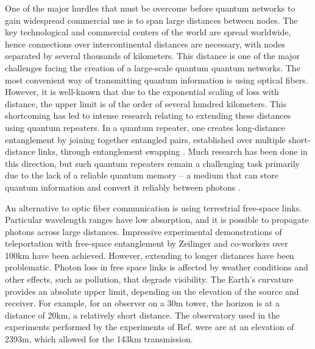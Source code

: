 \documentclass[aps,rmp,reprint,amsmath,amssymb,graphicx,longbibliography]{revtex4-1}
\begin{document}
One of the major hurdles that must be overcome before quantum networks to gain widespread commercial use is to span large distances between nodes.  The key technological and commercial centers of the world are spread worldwide, hence connections over intercontinental distances are necessary, with nodes separated by several thousands of kilometers. This distance is one of the major challenges facing the creation of a large-scale quantum quantum networks. The most convenient way of transmitting quantum information is using optical fibers. However, it is well-known that due to the exponential scaling of loss with distance, the upper limit is of the order of several hundred kilometers. This shortcoming has led to intense research relating to extending these distances using quantum repeaters. In a quantum repeater, one creates long-distance entanglement by joining together entangled pairs, established over multiple short-distance links, through entanglement swapping \cite{sangouard11}. Much research has been done in this direction, but such quantum repeaters remain a challenging task primarily due to the lack of a reliable quantum memory -- a medium that can store quantum information and convert it reliably between photons \cite{lvovsky2009optical,simon2010quantum,bussieres2013prospective, heshami2016quantum}. 

An alternative to optic fiber communication is using terrestrial free-space links. Particular wavelength ranges have low absorption, and it is possible to propagate photons across large distances. Impressive experimental demonstrations of teleportation with free-space entanglement by Zeilinger and co-workers \cite{ursin07,ma2012quantum,yin2013lower} over 100km have been achieved. However, extending to longer distances have been problematic.  Photon loss in free space links is affected by weather conditions and other effects, such as pollution, that degrade visibility. The Earth’s curvature provides an absolute upper limit, depending on the elevation of the source and receiver. For example, for an observer on a 30m tower, the horizon is at a distance of 20km, a relatively short distance. The observatory used in the experiments performed by the experiments of Ref. \cite{ursin07,ma2012quantum} were are at an elevation of 2393m, which allowed for the 143km transmission. 
\end{document}

